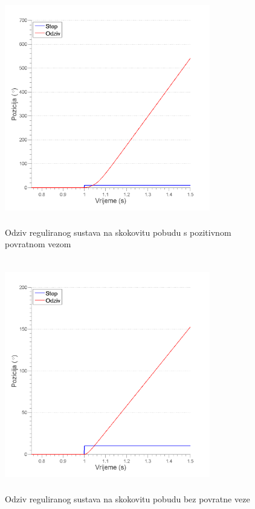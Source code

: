 \documentclass[12pt,a4paper]{article}
\begin{document}
\begin{figure}[h!]
	\begin{center}
	\includegraphics[width=0.8\textwidth, height = 4in] {odziv_pozitivna_povratna.png}
    \caption{Odziv reguliranog sustava na skokovitu pobudu s pozitivnom povratnom vezom }
    \end{center}
\end{figure}



\begin{figure}[h!]
	\begin{center}
	\includegraphics[width=0.8\textwidth, height = 4in] {odziv_bez_povratne.png}
    \caption{Odziv reguliranog sustava na skokovitu pobudu bez povratne veze }
    \end{center}
\end{figure}
\end{document}
